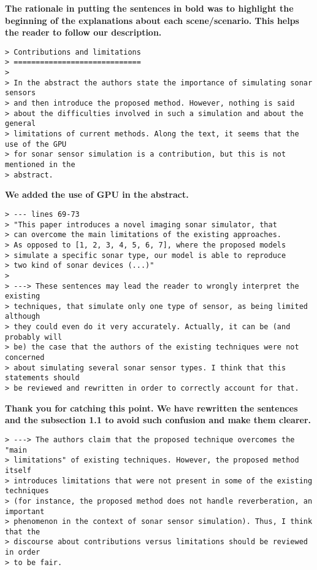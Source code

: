 \documentclass{article}
\begin{document}
\textbf{The rationale in putting the sentences in bold was to highlight the beginning
of the explanations about each scene/scenario. This helps the reader to follow our 
description.}

\begin{verbatim}
> Contributions and limitations
> =============================
>
> In the abstract the authors state the importance of simulating sonar sensors
> and then introduce the proposed method. However, nothing is said
> about the difficulties involved in such a simulation and about the general
> limitations of current methods. Along the text, it seems that the use of the GPU
> for sonar sensor simulation is a contribution, but this is not mentioned in the
> abstract.
\end{verbatim}

\textbf{We added the use of GPU in the abstract.}


\begin{verbatim}
> --- lines 69-73
> "This paper introduces a novel imaging sonar simulator, that
> can overcome the main limitations of the existing approaches.
> As opposed to [1, 2, 3, 4, 5, 6, 7], where the proposed models
> simulate a specific sonar type, our model is able to reproduce
> two kind of sonar devices (...)"
>
> ---> These sentences may lead the reader to wrongly interpret the existing
> techniques, that simulate only one type of sensor, as being limited although
> they could even do it very accurately. Actually, it can be (and probably will
> be) the case that the authors of the existing techniques were not concerned
> about simulating several sonar sensor types. I think that this statements should
> be reviewed and rewritten in order to correctly account for that.
\end{verbatim}

\textbf{Thank you for catching this point. We have rewritten the sentences
and the subsection 1.1 to avoid such confusion and make them clearer.}

\begin{verbatim}
> ---> The authors claim that the proposed technique overcomes the "main
> limitations" of existing techniques. However, the proposed method itself
> introduces limitations that were not present in some of the existing techniques
> (for instance, the proposed method does not handle reverberation, an important
> phenomenon in the context of sonar sensor simulation). Thus, I think that the
> discourse about contributions versus limitations should be reviewed in order
> to be fair.
\end{verbatim}
\end{document}
